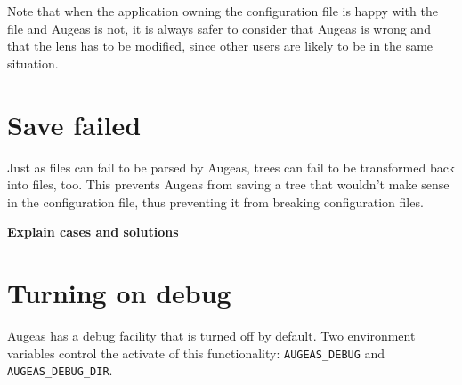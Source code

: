 Note that when the application owning the configuration file is happy with the file and Augeas is not, it is always safer to consider that Augeas is wrong and that the lens has to be modified, since other users are likely to be in the same situation.

\section{Save failed}

Just as files can fail to be parsed by Augeas, trees can fail to be transformed back into files, too. This prevents Augeas from saving a tree that wouldn't make sense in the configuration file, thus preventing it from breaking configuration files.

\textbf{Explain cases and solutions}

\section{Turning on debug}

 

Augeas has a debug facility that is turned off by default. Two environment variables control the activate of this functionality: \verb!AUGEAS_DEBUG! and \verb!AUGEAS_DEBUG_DIR!.


